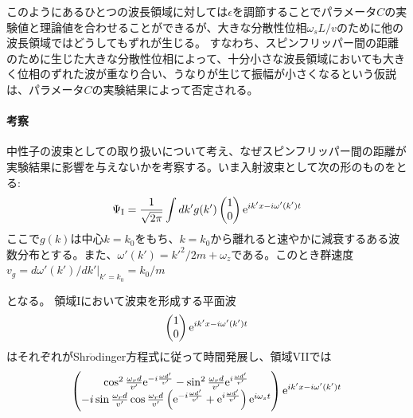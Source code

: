 このようにあるひとつの波長領域に対しては$\epsilon$を調節することでパラメータ$C$の実験値と理論値を合わせることができるが、大きな分散性位相$\omega_s L/v$のために他の波長領域ではどうしてもずれが生じる。
すなわち、スピンフリッパー間の距離のために生じた大きな分散性位相によって、十分小さな波長領域においても大きく位相のずれた波が重なり合い、うなりが生じて振幅が小さくなるという仮説は、パラメータ$C$の実験結果によって否定される。

\paragraph{考察}
\renewcommand{\arraystretch}{1.5}
中性子の波束としての取り扱いについて考え、なぜスピンフリッパー間の距離が実験結果に影響を与えないかを考察する。いま入射波束として次の形のものをとる:
\begin{equation}
\Psi_\mathrm{I}=\frac{1}{\sqrt{2\pi}}\int dk' g(k') \begin{pmatrix} 1\\ 0 \end{pmatrix} \mathrm{e}^{ik'x-i\omega'(k') t}
\end{equation}
ここで$g(k)$は中心$k=k_0$をもち、$k=k_0$から離れると速やかに減衰するある波数分布とする。また、$\omega'(k')=k'^2/2m+\omega_z$である。このとき群速度$v_g=d \omega'(k')/d k'|_{k'=k_0} =k_0/m$

となる。
領域Iにおいて波束を形成する平面波
\begin{equation}
\begin{pmatrix} 1\\ 0 \end{pmatrix} \mathrm{e}^{ik'x-i\omega'(k') t}
\end{equation}
はそれぞれがShr$\ddot{\mathrm{o}}$dinger方程式に従って時間発展し、領域VIIでは
\begin{equation}
\begin{pmatrix} \cos^2 \frac{\omega_r d}{v'} \mathrm{e}^{-i\frac{\omega d'}{v'}} -\sin^2 \frac{\omega_r d}{v'} \mathrm{e}^{i\frac{\omega d'}{v'}} \\ -i\sin\frac{\omega_r d}{v'}\cos\frac{\omega_r d}{v'}\left(\mathrm{e}^{-i\frac{\omega d'}{v'}}+\mathrm{e}^{i\frac{\omega d'}{v'}} \right) \mathrm{e}^{i\omega_s t} \end{pmatrix} \mathrm{e}^{i k'x-i\omega'(k')t}
\end{equation}
